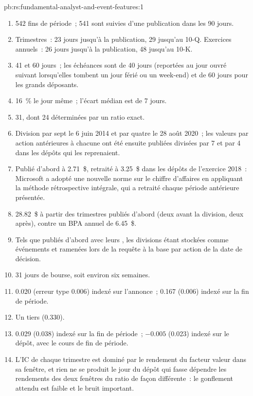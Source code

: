 \begin{solution}{pb:rs:fundamental-analyst-and-event-features:1}
\begin{enumerate}
\item 542 fins de période~; 541 sont suivies d'une publication dans les 90 jours.
\item Trimestres~: 23 jours jusqu'à la publication, 29 jusqu'au 10-Q. Exercices annuels~: 26 jours jusqu'à la publication, 48 jusqu'au 10-K.
\item 41 et 60 jours~; les échéances sont de 40 jours (reportées au jour ouvré suivant lorsqu'elles tombent un jour férié ou un week-end) et de 60 jours pour les grands déposants.
\item 16~\% le jour même~; l'écart médian est de 7 jours.
\item 31, dont 24 déterminées par un ratio exact.
\item Division par sept le 6 juin 2014 et par quatre le 28 août 2020~; les valeurs par action antérieures à chacune ont été ensuite publiées divisées par 7 et par 4 dans
les dépôts qui les reprenaient.
\item Publié d'abord à 2.71~\$, retraité à 3.25~\$ dans les dépôts de l'exercice 2018~: Microsoft a adopté une nouvelle norme sur le chiffre d'affaires en appliquant la
méthode rétrospective intégrale, qui a retraité chaque période antérieure présentée.
\item 28.82~\$ à partir des trimestres publiés d'abord (deux avant la division, deux après), contre un BPA annuel de 6.45~\$.
\item Tels que publiés d'abord avec leurs , les divisions étant stockées comme événements et ramenées lors de la requête à la
base par action de la date de décision.
\item 31 jours de bourse, soit environ six semaines.
\item 0.020 (erreur type 0.006) indexé sur l'annonce~; 0.167 (0.006) indexé sur la fin de période.
\item Un tiers (0.330).
\item 0.029 (0.038) indexé sur la fin de période~; $-0.005$ (0.023) indexé sur le dépôt, avec le cours de fin de période.
\item L'IC de chaque trimestre est dominé par le rendement du facteur valeur dans sa fenêtre, et rien ne se produit le jour du dépôt qui fasse dépendre les
rendements des deux fenêtres du ratio de façon différente~: le gonflement attendu est faible et le bruit important.

\end{enumerate}
\end{solution}
